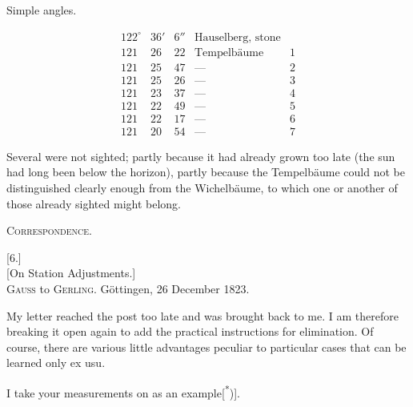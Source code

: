 \medskip
\noindent\begin{minipage}[t]{.43\textwidth}
\begin{center}Simple angles.\end{center}
\[
\begin{array}{rrrlr}
122^\circ&36'&6''&\text{Hauselberg, stone}&\\
121&26&22&\text{Tempelbäume}&1\\
121&25&47&\text{---}&2\\
121&25&26&\text{---}&3\\
121&23&37&\text{---}&4\\
121&22&49&\text{---}&5\\
121&22&17&\text{---}&6\\
121&20&54&\text{---}&7
\end{array}
\]
\end{minipage}\hfill
\begin{minipage}[t]{.54\textwidth}
\vspace{2.7\baselineskip}
Several were not sighted; partly because it had already grown too late (the sun had long been below the horizon), partly because the Tempelbäume could not be distinguished clearly enough from the Wichelbäume, to which one or another of those already sighted might belong.
\end{minipage}

\clearpage
{}\hfill\textsc{Correspondence.}\hfill\mbox{}\par\bigskip
\begin{center}
[6.]\\[7pt]
[On Station Adjustments.]\\[14pt]
\textsc{Gauss} to \textsc{Gerling}. Göttingen, 26 December 1823.
\end{center}
My letter reached the post too late and was brought back to me. I am therefore breaking it open again to add the practical instructions for elimination. Of course, there are various little advantages peculiar to particular cases that can be learned only ex usu.

I take your measurements on  as an example[\textsuperscript{*})].

